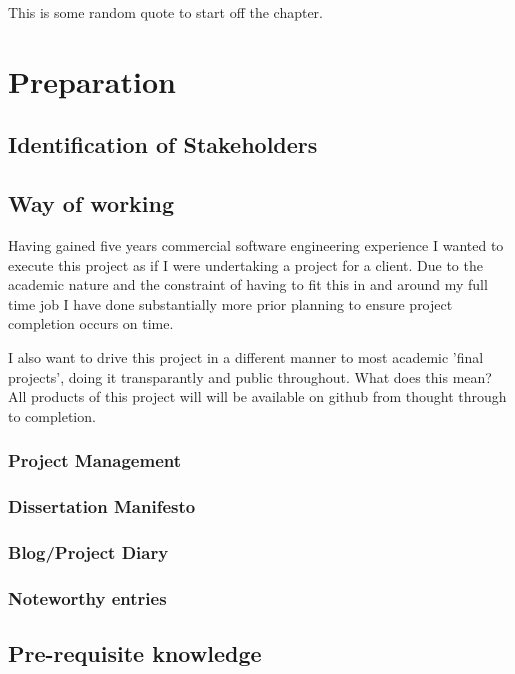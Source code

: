 \begin{savequote}[75mm]
This is some random quote to start off the chapter.
\end{savequote}

\chapter{Preparation}

\section{Identification of Stakeholders}

\section{Way of working}
Having gained five years commercial software engineering experience I wanted to execute this project as if I were undertaking a project for
a client. Due to the academic nature and the constraint of having to fit this in and around my full time job I have done substantially more
prior planning to ensure project completion occurs on time.

I also want to drive this project in a different manner to most academic 'final projects', doing it transparantly and public throughout.
What does this mean? All products of this project will will be available on github from thought through to completion.

\subsection{Project Management}


\subsection{Dissertation Manifesto}


\subsection{Blog/Project Diary}

\subsection{Noteworthy entries}

\section{Pre-requisite knowledge}

